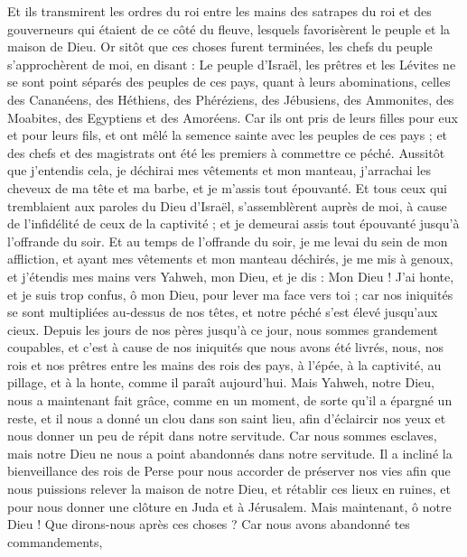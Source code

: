\begin{multicols}{2}
Et ils transmirent les ordres du roi entre les mains des satrapes du roi et des gouverneurs qui étaient de ce côté du fleuve, lesquels favorisèrent le peuple et la maison de Dieu.
\VerseOne{}Or sitôt que ces choses furent terminées, les chefs du peuple s'approchèrent de moi, en disant : Le peuple d'Israël, les prêtres et les Lévites ne se sont point séparés des peuples de ces pays, quant à leurs abominations, celles des Cananéens, des Héthiens, des Phéréziens, des Jébusiens, des Ammonites, des Moabites, des Egyptiens et des Amoréens.
Car ils ont pris de leurs filles pour eux et pour leurs fils, et ont mêlé la semence sainte avec les peuples de ces pays ; et des chefs et des magistrats ont été les premiers à commettre ce péché.
Aussitôt que j'entendis cela, je déchirai mes vêtements et mon manteau, j'arrachai les cheveux de ma tête et ma barbe, et je m'assis tout épouvanté.
Et tous ceux qui tremblaient aux paroles du Dieu d'Israël, s'assemblèrent auprès de moi, à cause de l'infidélité de ceux de la captivité ; et je demeurai assis tout épouvanté jusqu'à l'offrande du soir.
Et au temps de l'offrande du soir, je me levai du sein de mon affliction, et ayant mes vêtements et mon manteau déchirés, je me mis à genoux, et j'étendis mes mains vers Yahweh, mon Dieu,
et je dis : Mon Dieu ! J'ai honte, et je suis trop confus, ô mon Dieu, pour lever ma face vers toi ; car nos iniquités se sont multipliées au-dessus de nos têtes, et notre péché s'est élevé jusqu'aux cieux.
Depuis les jours de nos pères jusqu'à ce jour, nous sommes grandement coupables, et c'est à cause de nos iniquités que nous avons été livrés, nous, nos rois et nos prêtres entre les mains des rois des pays, à l'épée, à la captivité, au pillage, et à la honte, comme il paraît aujourd'hui.
Mais Yahweh, notre Dieu, nous a maintenant fait grâce, comme en un moment, de sorte qu'il a épargné un reste, et il nous a donné un clou dans son saint lieu, afin d'éclaircir nos yeux et nous donner un peu de répit dans notre servitude.
Car nous sommes esclaves, mais notre Dieu ne nous a point abandonnés dans notre servitude. Il a incliné la bienveillance des rois de Perse pour nous accorder de préserver nos vies afin que nous puissions relever la maison de notre Dieu, et rétablir ces lieux en ruines, et pour nous donner une clôture en Juda et à Jérusalem.
Mais maintenant, ô notre Dieu ! Que dirons-nous après ces choses ? Car nous avons abandonné tes commandements,

\end{multicols}
